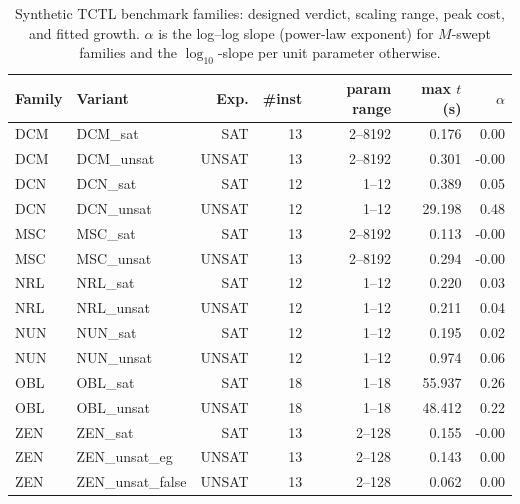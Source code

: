 \begin{table}[t]\centering
\caption{Synthetic TCTL benchmark families: designed verdict, scaling range, peak cost, and fitted growth. $\alpha$ is the log--log slope (power-law exponent) for $M$-swept families and the $\log_{10}$-slope per unit parameter otherwise.}
\label{tab:bench-family-summary}
\small
\begin{tabular}{llrrrrr}
\toprule
Family & Variant & Exp. & \#inst & param range & max $t$ (s) & $\alpha$ \\
\midrule
DCM & DCM\_sat & SAT & 13 & 2--8192 & 0.176 & 0.00 \\
DCM & DCM\_unsat & UNSAT & 13 & 2--8192 & 0.301 & -0.00 \\
\midrule
DCN & DCN\_sat & SAT & 12 & 1--12 & 0.389 & 0.05 \\
DCN & DCN\_unsat & UNSAT & 12 & 1--12 & 29.198 & 0.48 \\
\midrule
MSC & MSC\_sat & SAT & 13 & 2--8192 & 0.113 & -0.00 \\
MSC & MSC\_unsat & UNSAT & 13 & 2--8192 & 0.294 & -0.00 \\
\midrule
NRL & NRL\_sat & SAT & 12 & 1--12 & 0.220 & 0.03 \\
NRL & NRL\_unsat & UNSAT & 12 & 1--12 & 0.211 & 0.04 \\
\midrule
NUN & NUN\_sat & SAT & 12 & 1--12 & 0.195 & 0.02 \\
NUN & NUN\_unsat & UNSAT & 12 & 1--12 & 0.974 & 0.06 \\
\midrule
OBL & OBL\_sat & SAT & 18 & 1--18 & 55.937 & 0.26 \\
OBL & OBL\_unsat & UNSAT & 18 & 1--18 & 48.412 & 0.22 \\
\midrule
ZEN & ZEN\_sat & SAT & 13 & 2--128 & 0.155 & -0.00 \\
ZEN & ZEN\_unsat\_eg & UNSAT & 13 & 2--128 & 0.143 & 0.00 \\
ZEN & ZEN\_unsat\_false & UNSAT & 13 & 2--128 & 0.062 & 0.00 \\
\bottomrule
\end{tabular}
\end{table}
